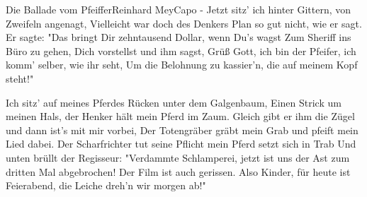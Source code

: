 \begin{song}{Die Ballade vom Pfeiffer}{Reinhard Mey}{Capo -}
Jetzt sitz' ich hinter Gittern, von Zweifeln angenagt,
Vielleicht war doch des Denkers Plan so gut nicht, wie er sagt.
Er sagte: "Das bringt Dir zehntausend Dollar, wenn Du's wagst
Zum Sheriff ins Büro zu gehen, Dich vorstellst und ihm sagst,
Grüß Gott, ich bin der Pfeifer, ich komm' selber, wie ihr seht,
Um die Belohnung zu kassier'n, die auf meinem Kopf steht!"

Ich sitz' auf meines Pferdes Rücken unter dem Galgenbaum,
Einen Strick um meinen Hals, der Henker hält mein Pferd im Zaum.
Gleich gibt er ihm die Zügel und dann ist's mit mir vorbei,
Der Totengräber gräbt mein Grab und pfeift mein Lied dabei.
Der Scharfrichter tut seine Pflicht mein Pferd setzt sich in Trab
Und unten brüllt der Regisseur:
"Verdammte Schlamperei, jetzt ist uns der Ast zum dritten Mal abgebrochen!
Der Film ist auch gerissen. Also Kinder, für heute ist Feierabend,
die Leiche dreh'n wir morgen ab!" \cl{[D E7 Am]}









\end{song}
